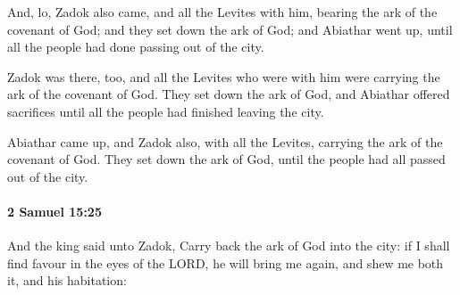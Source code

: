 			\begin{versebox}
					\item[BHS] 
					\item[ASV] And, lo, Zadok also came, and all the Levites with him, bearing the ark of the covenant of God; and they set down the ark of God; and Abiathar went up, until all the people had done passing out of the city.
					\item[NIV] Zadok was there, too, and all the Levites who were with him were carrying the ark of the covenant of God. They set down the ark of God, and Abiathar offered sacrifices until all the people had finished leaving the city.
					\item[NRSV] Abiathar came up, and Zadok also, with all the Levites, carrying the ark of the covenant of God. They set down the ark of God, until the people had all passed out of the city.
			\end{versebox}

		\paragraph{2 Samuel 15:25} %
			\label{2SAMUEL-15-25}

			And the king said unto Zadok, Carry back the ark of God into the city: if I shall find favour in the eyes of the LORD, he will bring me again, and shew me both it, and his habitation:

